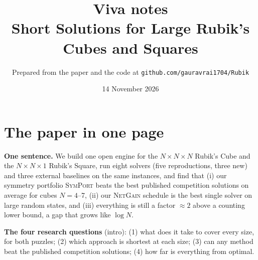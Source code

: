\documentclass[10.5pt,a4paper]{article}
\title{\textbf{Viva notes}\\[2pt]\large Short Solutions for Large Rubik's Cubes and Squares}
\author{Prepared from the paper and the code at \texttt{github.com/gauravrai1704/Rubik}}
\date{14 November 2026}
\newcommand{\M}[1]{\textsc{#1}}
\begin{document}
\maketitle
\setcounter{tocdepth}{1}\tableofcontents
\newpage

\section{The paper in one page}

\begin{keybox}
\textbf{One sentence.} We build one open engine for the $N{\times}N{\times}N$ Rubik's Cube and the $N{\times}N{\times}1$ Rubik's
Square, run eight solvers (five reproductions, three new) and three external baselines on the same instances, and find that
(i) our symmetry portfolio \M{SymPort} beats the best published competition solutions on average for cubes $N=4$--7,
(ii) our \M{NetGain} schedule is the best single solver on large random states, and (iii) everything is still a factor
$\approx 2$ above a counting lower bound, a gap that grows like $\log N$.
\end{keybox}

\textbf{The four research questions} (intro): (1) what does it take to cover every size, for both puzzles; (2) which approach
is shortest at each size; (3) can any method beat the published competition solutions; (4) how far is everything from optimal.
\end{document}
